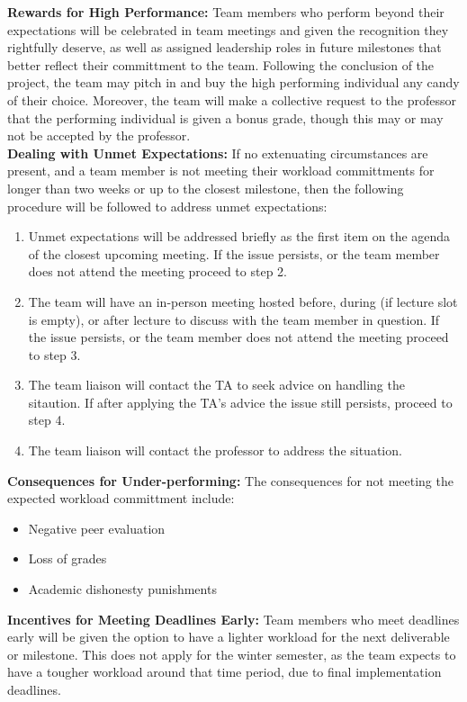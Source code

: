 \documentclass{article}
\begin{document}
\noindent\textbf{Rewards for High Performance:} Team members who perform beyond their expectations will be celebrated in team meetings and given the recognition they rightfully deserve, as well as assigned leadership roles in future milestones that better reflect their
committment to the team. Following the conclusion of the project, the team may pitch in and buy the high performing individual any candy of their choice. Moreover, the team will make a collective request to the professor that the performing individual is given a bonus grade,
though this may or may not be accepted by the professor. \\

\noindent\textbf{Dealing with Unmet Expectations:}
If no extenuating circumstances are present, and a team member is not meeting their workload committments for longer than two weeks or up to the closest milestone, then the following procedure will be followed to address unmet expectations: \\

\begin{enumerate}
  \item Unmet expectations will be addressed briefly as the first item on the agenda of the closest upcoming meeting. If the issue persists, or the team member does not attend the meeting
  proceed to step 2.
  \item The team will have an in-person meeting hosted before, during (if lecture slot is empty), or after lecture to discuss with the team member in question. If the issue persists, or the team member does not attend the meeting
  proceed to step 3.
  \item The team liaison will contact the TA to seek advice on handling the sitaution. If after applying the TA's advice the issue still persists, proceed to step 4.
  \item The team liaison will contact the professor to address the situation.
\end{enumerate}

\noindent\textbf{Consequences for Under-performing:}
The consequences for not meeting the expected workload committment include: 
\begin{itemize}
  \item Negative peer evaluation
  \item Loss of grades
  \item Academic dishonesty punishments
\end{itemize}


\noindent\textbf{Incentives for Meeting Deadlines Early:} Team members who meet deadlines early will be given the option
to have a lighter workload for the next deliverable or milestone. This does not apply for the winter semester,
as the team expects to have a tougher workload around that time period, due to final implementation deadlines. \\
\end{document}
